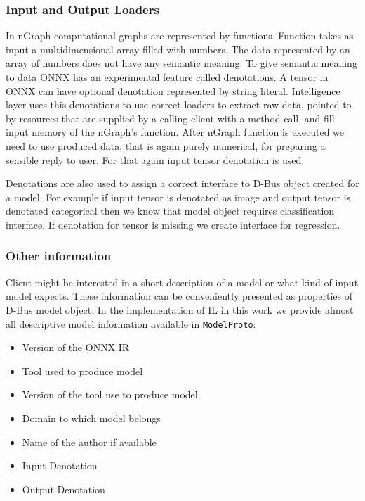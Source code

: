 \documentclass[english, 12pt, a4paper, elec, utf8, online]{aaltothesis}
\begin{document}
\subsubsection{Input and Output Loaders} 
In nGraph computational graphs are represented by functions. Function takes as input a multidimensional array filled with numbers. The data represented by an array of numbers does not have any semantic meaning. To give semantic meaning to data ONNX has an experimental feature called denotations. A tensor in ONNX can have optional denotation represented by string literal. Intelligence layer uses this denotations to use correct loaders to extract raw data, pointed to by resources that are supplied by a calling client with a method call, and fill input memory of the nGraph's function. After nGraph function is executed we need to use produced data, that is again purely numerical, for preparing a sensible reply to user. For that again input tensor denotation is used.        
  
Denotations are also used to assign a correct interface to D-Bus object created for a model. For example if input tensor is denotated as image and output tensor is denotated categorical then we know that model object requires classification interface. If denotation for tensor is missing we create interface for regression.               
                  
\subsubsection{Other information}
Client might be interested in a short description of a model or what kind of input model expects. These information can be conveniently presented as properties of D-Bus model object. In the implementation of IL in this work we provide almost all descriptive model information available in \texttt{ModelProto}:
\begin{itemize}
\item
Version of the ONNX IR
\item
Tool used to produce model
\item
Version of the tool use to produce model
\item
Domain to which model belongs
\item
Name of the author if available
\item
Input Denotation
\item
Output Denotation
\end{itemize}
\end{document}
